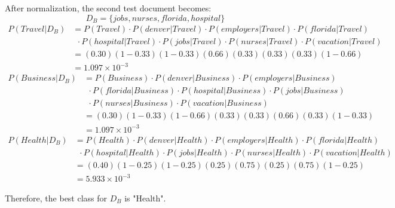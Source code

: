 \documentclass[11pt]{article}
\begin{document}
\begin{enumerate}
        After normalization, the second test document becomes:        
        \begin{equation*}
            D_B=\{jobs, nurses, florida, hospital\}
        \end{equation*}
        \begin{align*}
            P(Travel | D_B) &= P(Travel) \cdot P(denver | Travel) \cdot P(employers | Travel) \cdot P(florida | Travel) \\
            & \ \ \cdot P(hospital | Travel) \cdot P(jobs | Travel) \cdot P(nurses | Travel) \cdot P(vacation | Travel) \\
            &= (0.30)(1 - 0.33)(1 - 0.33)(0.66)(0.33)(0.33)(0.33)(1 - 0.66) \\
            &= 1.097\times10^{-3}
        \end{align*}
        \begin{align*}
            P(Business | D_B) &= P(Business) \cdot P(denver | Business) \cdot P(employers | Business) \\
            & \ \ \cdot P(florida | Business) \cdot P(hospital | Business) \cdot P(jobs | Business) \\
            & \ \ \cdot P(nurses | Business) \cdot P(vacation | Business) \\
            &= (0.30)(1 - 0.33)(1 - 0.66)(0.33)(0.33)(0.66)(0.33)(1 - 0.33) \\
            &= 1.097\times10^{-3}
        \end{align*}
        \begin{align*}
            P(Health | D_B) &= P(Health) \cdot P(denver | Health) \cdot P(employers | Health) \cdot P(florida | Health) \\
            & \ \ \cdot P(hospital | Health) \cdot P(jobs | Health) \cdot P(nurses | Health) \cdot P(vacation | Health) \\
            &= (0.40)(1 - 0.25)(1 - 0.25)(0.25)(0.75)(0.25)(0.75)(1 - 0.25)            \\
            &= 5.933\times10^{-3}
        \end{align*}

        Therefore, the best class for $D_B$ is "Health".

    \end{enumerate}
\end{document}

